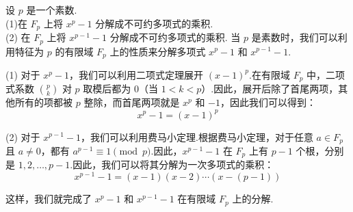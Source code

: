\begin{tcolorbox}[breakable,colback=blue!5!white,colframe=blue!75!black,
 title= 解答题]
 
 设 $ p $ 是一个素数.\\
(1)在 $ F_{p} $ 上将 $ x^{p}-1 $ 分解成不可约多项式的乘积.\\
(2) 在 $ F_{p} $ 上将 $ x^{p-1}-1 $ 分解成不可约多项式的乘积.
 \tcblower
当 $p$ 是素数时，我们可以利用特征为 $p$ 的有限域 $F_{p}$ 上的性质来分解多项式 $x^{p}-1$ 和 $x^{p-1}-1$.

(1) 对于 $x^{p}-1$，我们可以利用二项式定理展开 $(x-1)^p$.在有限域 $F_{p}$ 中，二项式系数 $\binom{p}{k}$ 对 $p$ 取模后都为 $0$（当 $1 < k < p$）.因此，展开后除了首尾两项，其他所有的项都被 $p$ 整除，而首尾两项就是 $x^{p}$ 和 $-1$，因此我们可以得到：
\[ x^{p}-1 = (x-1)^{p} \]

(2) 对于 $x^{p-1}-1$，我们可以利用费马小定理.根据费马小定理，对于任意 $a \in F_{p}$ 且 $a \neq 0$，都有 $a^{p-1} \equiv 1 \pmod{p}$.因此，$x^{p-1}-1$ 在 $F_{p}$ 上有 $p-1$ 个根，分别是 $1, 2, \ldots, p-1$.因此，我们可以将其分解为一次多项式的乘积：
\[ x^{p-1}-1 = (x-1)(x-2)\cdots(x-(p-1)) \]

这样，我们就完成了 $x^{p}-1$ 和 $x^{p-1}-1$ 在有限域 $F_{p}$ 上的分解.
 \end{tcolorbox}



 

